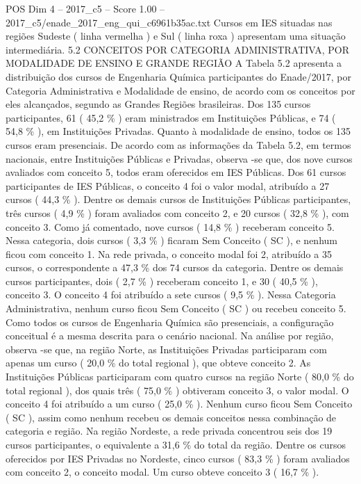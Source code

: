 \begin{textsample}{POS Dim 4 – 2017\_c5 – Score 1.00 – 2017\_c5/enade\_2017\_eng\_qui\_c6961b35ac.txt}
Cursos em IES situadas nas regiões Sudeste ( linha vermelha ) e Sul ( linha roxa ) apresentam uma situação intermediária. 5.2 CONCEITOS POR CATEGORIA ADMINISTRATIVA, POR MODALIDADE DE ENSINO E GRANDE REGIÃO A Tabela 5.2 apresenta a distribuição dos cursos de Engenharia Química participantes do Enade/2017, por Categoria Administrativa e Modalidade de ensino, de acordo com os conceitos por eles alcançados, segundo as Grandes Regiões brasileiras.
Dos 135 cursos participantes, 61 ( 45,2 \% ) eram ministrados em Instituições Públicas, e 74 ( 54,8 \% ), em Instituições Privadas.
Quanto à modalidade de ensino, todos os 135 cursos eram presenciais.
De acordo com as informações da Tabela 5.2, em termos nacionais, entre Instituições Públicas e Privadas, observa -se que, dos nove cursos avaliados com conceito 5, todos eram oferecidos em IES Públicas.
Dos 61 cursos participantes de IES Públicas, o conceito 4 foi o valor modal, atribuído a 27 cursos ( 44,3 \% ).
Dentre os demais cursos de Instituições Públicas participantes, três cursos ( 4,9 \% ) foram avaliados com conceito 2, e 20 cursos ( 32,8 \% ), com conceito 3.
Como já comentado, nove cursos ( 14,8 \% ) receberam conceito 5.
Nessa categoria, dois cursos ( 3,3 \% ) ficaram Sem Conceito ( SC ), e nenhum ficou com conceito 1.
Na rede privada, o conceito modal foi 2, atribuído a 35 cursos, o correspondente a 47,3 \% dos 74 cursos da categoria.
Dentre os demais cursos participantes, dois ( 2,7 \% ) receberam conceito 1, e 30 ( 40,5 \% ), conceito 3.
O conceito 4 foi atribuído a sete cursos ( 9,5 \% ).
Nessa Categoria Administrativa, nenhum curso ficou Sem Conceito ( SC ) ou recebeu conceito 5.
Como todos os cursos de Engenharia Química são presenciais, a configuração conceitual é a mesma descrita para o cenário nacional.
Na análise por região, observa -se que, na região Norte, as Instituições Privadas participaram com apenas um curso ( 20,0 \% do total regional ), que obteve conceito 2.
As Instituições Públicas participaram com quatro cursos na região Norte ( 80,0 \% do total regional ), dos quais três ( 75,0 \% ) obtiveram conceito 3, o valor modal.
O conceito 4 foi atribuído a um curso ( 25,0 \% ).
Nenhum curso ficou Sem Conceito ( SC ), assim como nenhum recebeu os demais conceitos nessa combinação de categoria e região.
Na região Nordeste, a rede privada concentrou seis dos 19 cursos participantes, o equivalente a 31,6 \% do total da região.
Dentre os cursos oferecidos por IES Privadas no Nordeste, cinco cursos ( 83,3 \% ) foram avaliados com conceito 2, o conceito modal.
Um curso obteve conceito 3 ( 16,7 \% ).

\end{textsample}

